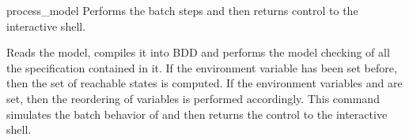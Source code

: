 \begin{nusmvCommand}{process\_model} {Performs the batch steps and then returns control to the interactive shell.}


Reads the model, compiles it into BDD and performs the model checking
of all the specification contained in it. If the environment variable
 has been set before, then the set of
reachable states is computed. If the environment variables
 and  are set, then
the reordering of variables is performed accordingly. This command
simulates the batch behavior of \nusmv and then returns the control to
the interactive shell.

\begin{cmdOpt}
 
 

\end{cmdOpt}
\end{nusmvCommand}
